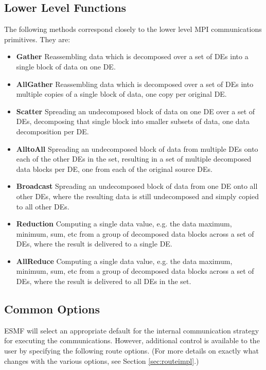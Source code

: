 \subsection{Lower Level Functions}
The following methods correspond closely to the lower level
MPI communications primitives.  They are:

\begin{itemize}

\item {\bf Gather}
Reassembling data which is decomposed over a set of DEs into a single
block of data on one DE.
\item {\bf AllGather}
Reassembling data which is decomposed over a set of DEs into multiple
copies of a single block of data, one copy per original DE.
\item {\bf Scatter}
Spreading an undecomposed block of data on one DE over a set of DEs,
decomposing that single block into smaller subsets of data, one
data decomposition per DE.
\item {\bf AlltoAll}
Spreading an undecomposed block of data from multiple DEs onto
each of the other DEs in the set, resulting in a set of multiple decomposed 
data blocks per DE, one from each of the original source DEs.
\item {\bf Broadcast}
Spreading an undecomposed block of data from one DE onto all other
DEs, where the resulting data is still undecomposed and simply
copied to all other DEs.
\item {\bf Reduction}
Computing a single data value, e.g. the data maximum, minimum, sum, etc
from a group of decomposed data blocks across a set of DEs, where the
result is delivered to a single DE.
\item {\bf AllReduce}
Computing a single data value, e.g. the data maximum, minimum, sum, etc
from a group of decomposed data blocks across a set of DEs, where the
result is delivered to all DEs in the set.

\end{itemize}

\subsection{Common Options}
\label{sec:routeoptions}

ESMF will select an appropriate default for the
internal communication strategy for executing the communications.  
However, additional control is available
to the user by specifying the following route options.
(For more details on exactly what changes with the various options,
see Section \ref{sec:routeimpl}.)

